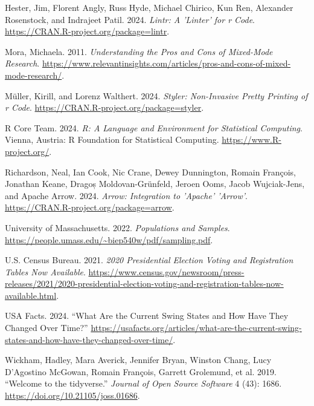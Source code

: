 \documentclass[
  letterpaper,
  DIV=11,
  numbers=noendperiod]{scrartcl}
\newlength{\cslhangindent}
\newlength{\cslentryspacingunit} %
\newenvironment{CSLReferences}[2] %
 {%
  \setlength{\parindent}{0pt}
  \ifodd #1
  \let\oldpar\par
  \def\par{\hangindent=\cslhangindent\oldpar}
  \fi
  \setlength{\parskip}{#2\cslentryspacingunit}
 }%
 {}
\begin{document}
\begin{CSLReferences}{1}{0}
\leavevmode{}%
Hester, Jim, Florent Angly, Russ Hyde, Michael Chirico, Kun Ren,
Alexander Rosenstock, and Indrajeet Patil. 2024. \emph{Lintr: A 'Linter'
for r Code}. \url{https://CRAN.R-project.org/package=lintr}.

\leavevmode{}%
Mora, Michaela. 2011. \emph{Understanding the Pros and Cons of
Mixed-Mode Research}.
\url{https://www.relevantinsights.com/articles/pros-and-cons-of-mixed-mode-research/}.

\leavevmode{}%
Müller, Kirill, and Lorenz Walthert. 2024. \emph{Styler: Non-Invasive
Pretty Printing of r Code}.
\url{https://CRAN.R-project.org/package=styler}.

\leavevmode{}%
R Core Team. 2024. \emph{R: A Language and Environment for Statistical
Computing}. Vienna, Austria: R Foundation for Statistical Computing.
\url{https://www.R-project.org/}.

\leavevmode{}%
Richardson, Neal, Ian Cook, Nic Crane, Dewey Dunnington, Romain
François, Jonathan Keane, Dragoș Moldovan-Grünfeld, Jeroen Ooms, Jacob
Wujciak-Jens, and Apache Arrow. 2024. \emph{Arrow: Integration to
'Apache' 'Arrow'}. \url{https://CRAN.R-project.org/package=arrow}.

\leavevmode{}%
University of Massachusetts. 2022. \emph{Populations and Samples}.
\url{https://people.umass.edu/~biep540w/pdf/sampling.pdf}.

\leavevmode{}%
U.S. Census Bureau. 2021. \emph{2020 Presidential Election Voting and
Registration Tables Now Available}.
\url{https://www.census.gov/newsroom/press-releases/2021/2020-presidential-election-voting-and-registration-tables-now-available.html}.

\leavevmode{}%
USA Facts. 2024. {``{What Are the Current Swing States and How Have They
Changed Over Time?}''}
\url{https://usafacts.org/articles/what-are-the-current-swing-states-and-how-have-they-changed-over-time/}.

\leavevmode{}%
Wickham, Hadley, Mara Averick, Jennifer Bryan, Winston Chang, Lucy
D'Agostino McGowan, Romain François, Garrett Grolemund, et al. 2019.
{``Welcome to the {tidyverse}.''} \emph{Journal of Open Source Software}
4 (43): 1686. \url{https://doi.org/10.21105/joss.01686}.

\end{CSLReferences}
\end{document}
